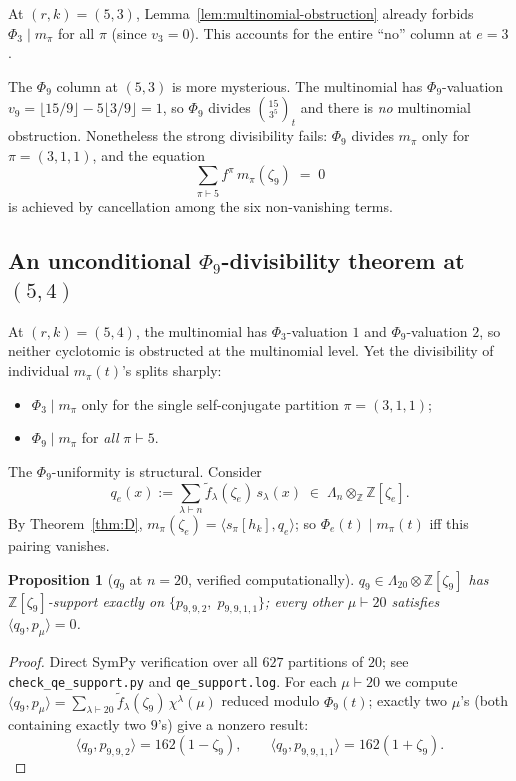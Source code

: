 \documentclass[11pt]{article}
\newtheorem{proposition}[theorem]{Proposition}
\theoremstyle{plain}
\theoremstyle{definition}
\theoremstyle{remark}
\newcommand{\fdeg}{\widetilde{f}}
\newcommand{\ZZ}{\mathbb{Z}}
\begin{document}
At $(r, k) = (5, 3)$, Lemma~\ref{lem:multinomial-obstruction} already forbids $\Phi_3 \mid m_\pi$ for all $\pi$
(since $v_3 = 0$).  This accounts for the entire ``no'' column at $e = 3$.

The $\Phi_9$ column at $(5, 3)$ is more mysterious.  The multinomial has $\Phi_9$-valuation
$v_9 = \lfloor 15/9\rfloor - 5\lfloor 3/9\rfloor = 1$, so $\Phi_9$ divides
$\binom{15}{3^5}_t$ and there is \emph{no} multinomial obstruction.  Nonetheless
the strong divisibility fails: $\Phi_9$ divides $m_\pi$ only for $\pi = (3, 1, 1)$,
and the equation
\[
\sum_{\pi \vdash 5} f^\pi\, m_\pi(\zeta_9) \;=\; 0
\]
is achieved by cancellation among the six non-vanishing terms.

\subsection{An unconditional $\Phi_9$-divisibility theorem at $(5, 4)$}

At $(r, k) = (5, 4)$, the multinomial has $\Phi_3$-valuation $1$ and $\Phi_9$-valuation
$2$, so neither cyclotomic is obstructed at the multinomial level.  Yet the divisibility of
individual $m_\pi(t)$'s splits sharply:
\begin{itemize}
\item $\Phi_3 \mid m_\pi$ only for the single self-conjugate partition $\pi = (3, 1, 1)$;
\item $\Phi_9 \mid m_\pi$ for \emph{all} $\pi \vdash 5$.
\end{itemize}

The $\Phi_9$-uniformity is structural.  Consider
\[
q_e(x) := \sum_{\lambda \vdash n} \fdeg_\lambda(\zeta_e)\, s_\lambda(x) \;\in\; \Lambda_n \otimes_{\ZZ} \ZZ[\zeta_e].
\]
By Theorem~\ref{thm:D}, $m_\pi(\zeta_e) = \langle s_\pi[h_k], q_e\rangle$; so $\Phi_e(t) \mid m_\pi(t)$
iff this pairing vanishes.

\begin{proposition}[$q_9$ at $n = 20$, verified computationally]\label{prop:q9-support}
$q_9 \in \Lambda_{20} \otimes \ZZ[\zeta_9]$ has $\ZZ[\zeta_9]$-support exactly on
$\{p_{9,9,2},\; p_{9,9,1,1}\}$; every other $\mu \vdash 20$ satisfies $\langle q_9, p_\mu\rangle = 0$.
\end{proposition}

\begin{proof}
Direct SymPy verification over all $627$ partitions of $20$; see \texttt{check\_qe\_support.py}
and \texttt{qe\_support.log}.  For each $\mu \vdash 20$ we compute
$\langle q_9, p_\mu\rangle = \sum_{\lambda \vdash 20} \fdeg_\lambda(\zeta_9)\, \chi^\lambda(\mu)$
reduced modulo $\Phi_9(t)$; exactly two $\mu$'s (both containing exactly two $9$'s)
give a nonzero result:
\[
\langle q_9, p_{9,9,2}\rangle = 162(1 - \zeta_9), \qquad
\langle q_9, p_{9,9,1,1}\rangle = 162(1 + \zeta_9).
\]
\end{proof}
\end{document}
